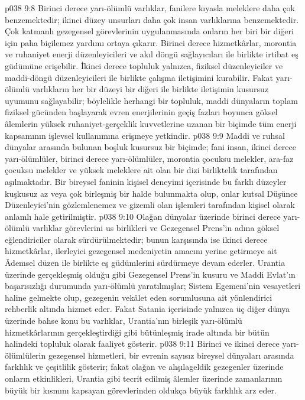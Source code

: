 \vs p038 9:8 Birinci derece yarı\hyp{}ölümlü varlıklar, fanilere kıyasla meleklere daha çok benzemektedir; ikinci düzey unsurları daha çok insan varlıklarına benzemektedir. Çok katmanlı gezegensel görevlerinin uygulanmasında onların her biri bir diğeri için paha biçilemez yardımı ortaya çıkarır. Birinci derece hizmetkârlar, morontia ve ruhaniyet enerji düzenleyicileri ve akıl döngü sağlayıcıları ile birlikte irtibat eş güdümüne erişebilir. İkinci derece topluluk yalnızca, fiziksel düzenleyiciler ve maddi\hyp{}döngü düzenleyicileri ile birlikte çalışma iletişimini kurabilir. Fakat yarı\hyp{}ölümlü varlıkların her bir düzeyi bir diğeri ile birlikte iletişimin kusursuz uyumunu sağlayabilir; böylelikle herhangi bir topluluk, maddi dünyaların toplam fiziksel gücünden başlayarak evren enerjilerinin geçiş fazları boyunca göksel âlemlerin yüksek ruhaniyet\hyp{}gerçeklik kuvvetlerine uzanan bir biçimde tüm enerji kapsamının işlevsel kullanımına erişmeye yetkindir.
\vs p038 9:9 Maddi ve ruhsal dünyalar arasında bulunan boşluk kusursuz bir biçimde; fani insan, ikinci derece yarı\hyp{}ölümlüler, birinci derece yarı\hyp{}ölümlüler, morontia çocuksu melekler, ara\hyp{}faz çocuksu melekler ve yüksek meleklere ait olan bir dizi birliktelik tarafından aşılmaktadır. Bir bireysel faninin kişisel deneyimi içerisinde bu farklı düzeyler kuşkusuz az veya çok birleşmiş bir halde bulunmakta olup, onlar kutsal Düşünce Düzenleyici’nin gözlemlenemez ve gizemli olan işlemleri tarafından kişisel olarak anlamlı hale getirilmiştir.
\vs p038 9:10 Olağan dünyalar üzerinde birinci derece yarı\hyp{}ölümlü varlıklar görevlerini us birlikleri ve Gezegensel Prens’in adına göksel eğlendiriciler olarak sürdürülmektedir; bunun karşısında ise ikinci derece hizmetkârlar, ilerleyici gezegensel medeniyetin amacını yerine getirmeye ait Âdemsel düzen ile birlikte eş güdümlerini sürdürmeye devam ederler. Urantia üzerinde gerçekleşmiş olduğu gibi Gezegensel Prens’in kusuru ve Maddi Evlat’ın başarısızlığı durumunda yarı\hyp{}ölümlü yaratılmışlar; Sistem Egemeni’nin vesayetleri haline gelmekte olup, gezegenin vekâlet eden sorumlusuna ait yönlendirici rehberlik altında hizmet eder. Fakat Satania içerisinde yalnızca üç diğer dünya üzerinde bahse konu bu varlıklar, Urantia’nın birleşik yarı\hyp{}ölümlü hizmetkârlarının gerçekleştirdiği gibi bütünleşmiş irade altında bir bütün halindeki topluluk olarak faaliyet gösterir.
\vs p038 9:11 Birinci ve ikinci derece yarı\hyp{}ölümlülerin gezegensel hizmetleri, bir evrenin sayısız bireysel dünyaları arasında farklılık ve çeşitlilik gösterir; fakat olağan ve alışılageldik gezegenler üzerinde onların etkinlikleri, Urantia gibi tecrit edilmiş âlemler üzerinde zamanlarının büyük bir kısmını kapsayan görevlerinden oldukça büyük farklılık arz eder.
